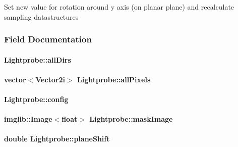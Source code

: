 \-Set new value for rotation around y axis (on planar plane) and recalculate sampling datastructures 

\subsubsection{\-Field \-Documentation}
\hypertarget{classLightprobe_a95e255a27e98a2c0b2d4df167365ccdd}{
\paragraph[{all\-Dirs}]{ {\bf \-Lightprobe\-::all\-Dirs}}}\label{classLightprobe_a95e255a27e98a2c0b2d4df167365ccdd}
\hypertarget{classLightprobe_a47e0a0ac6509b630c45b26ea50c3bc6a}{
\paragraph[{all\-Pixels}]{\setlength{\rightskip}{0pt plus 5cm}vector$<$\-Vector2i$>$ {\bf \-Lightprobe\-::all\-Pixels}}}\label{classLightprobe_a47e0a0ac6509b630c45b26ea50c3bc6a}
\hypertarget{classLightprobe_a2a75a5ac0b6fd74f9b6007e6f4bee079}{
\paragraph[{config}]{ {\bf \-Lightprobe\-::config}}}\label{classLightprobe_a2a75a5ac0b6fd74f9b6007e6f4bee079}
\hypertarget{classLightprobe_aab72db6ab7c231959a7c5943ca8fc97f}{
\paragraph[{mask\-Image}]{\setlength{\rightskip}{0pt plus 5cm}imglib\-::\-Image$<$float$>$ {\bf \-Lightprobe\-::mask\-Image}}}\label{classLightprobe_aab72db6ab7c231959a7c5943ca8fc97f}
\hypertarget{classLightprobe_a44b795e2f349dd13489799890bd86c9a}{
\paragraph[{plane\-Shift}]{\setlength{\rightskip}{0pt plus 5cm}double {\bf \-Lightprobe\-::plane\-Shift}}}\label{classLightprobe_a44b795e2f349dd13489799890bd86c9a}
